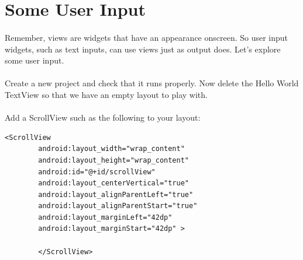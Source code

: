 



\section{Some User Input}
\paragraph{} Remember, views are widgets that have an appearance onscreen. So user input widgets, such as text inputs, can use views just as output does. Let's explore some user input.

\paragraph{} Create a new project and check that it runs properly. Now delete the Hello World TextView so that we have an empty layout to play with.

\paragraph{} Add a ScrollView such as the following to your layout:

\begin{lstlisting}
<ScrollView
        android:layout_width="wrap_content"
        android:layout_height="wrap_content"
        android:id="@+id/scrollView"
        android:layout_centerVertical="true"
        android:layout_alignParentLeft="true"
        android:layout_alignParentStart="true"
        android:layout_marginLeft="42dp"
        android:layout_marginStart="42dp" >

        </ScrollView>
\end{lstlisting}

